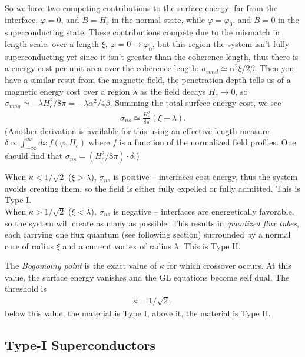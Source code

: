 \documentclass[10pt,twoside]{report}
\numberwithin{equation}{chapter}
\begin{document}
So we have two competing contributions to the surface energy:  far from the interface, $\varphi=0$, and $B = H_{c}$ in the normal state, while $\varphi = \varphi_{0}$, and $B=0$ in the superconducting state.  These contributions compete due to the mismatch in length scale: over a length $\xi$, $\varphi = 0 \to \varphi_{0}$, but this region the system isn't fully superconducting yet since it isn't greater than the coherence length, thus there is a energy cost per unit area over the coherence length: $\sigma_{cond} \simeq \alpha^{2}\xi/2\beta$.  Then you have a similar resut from the magnetic field, the penetration depth tells us of a magnetic energy cost over a region $\lambda$ as the field decays $H_{c} \to 0$, so $\sigma_{mag} \simeq -\lambda H_{c}^{2}/8\pi = -\lambda\alpha^{2}/4\beta$.  Summing the total surfece energy cost, we see
\begin{align}
  \sigma_{ns} \simeq \frac{H_{c}^{2}}{8\pi}(\xi-\lambda).
\end{align}
(Another derivation is available for this using an effective length measure $\delta \propto \int_{- \infty}^{ \infty}dx\,f(\varphi,H_{c})$ where $f$ is a function of the normalized field profiles.  One should find that $\sigma_{ns}= \left( H_{c}^{2}/8\pi \right) \cdot \delta$.)

When $\kappa<1/\sqrt{2}$ ($\xi>\lambda$), $\sigma_{ns}$ is positive -- interfaces cost energy, thus the system avoids creating them, so the field is either fully expelled or fully admitted.  This is Type I. \\

When $\kappa>1/\sqrt{2}$ ($\xi<\lambda$), $\sigma_{ns}$ is negative -- interfaces are energetically favorable, so the system will create as many as possible.  This results in \textit{quantized flux tubes}, each carrying one flux quantum (see following section) surrounded by a normal core of radius $\xi$ and a current vortex of radius $\lambda$.  This is Type II.

The \textit{Bogomolny point} is the exact value of $\kappa$ for which crossover occurs.  At this value, the surface energy vanishes and the GL equations become self dual.  The threshold is 
\begin{align}
  \kappa = 1/\sqrt{2},
\end{align}
below this value, the material is Type I, above it, the material is Type II.

\subsection{Type-I Superconductors}
\end{document}
